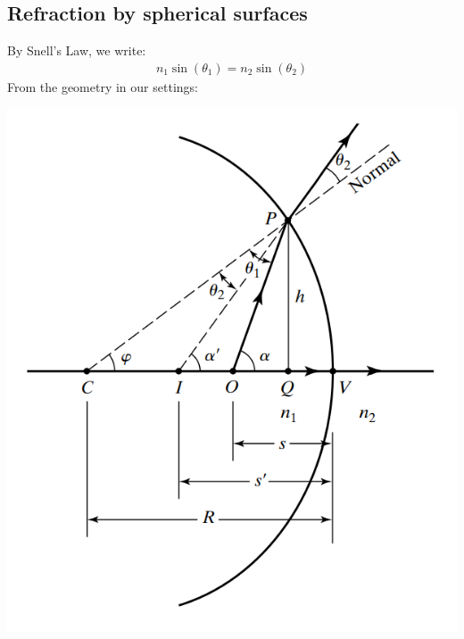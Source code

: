 \documentclass[11pt]{book}
\theoremstyle{break}
\theoremstyle{break}
\begin{document}
\subsection*{Refraction by spherical surfaces}
By Snell's Law, we write:
\begin{align*}
n_1 \sin(\theta_1) = n_2 \sin(\theta_2)
\end{align*}
From the geometry in our settings:
\begin{center}
\includegraphics[scale=0.45]{refracSur.png}
\end{center}
\end{document}
